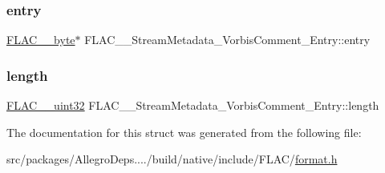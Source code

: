 \subsubsection{\texorpdfstring{entry}{entry}}
{\footnotesize\ttfamily \hyperlink{ordinals_8h_a5eb569b12d5b047cdacada4d57924ee3}{F\+L\+A\+C\+\_\+\+\_\+byte}$\ast$ F\+L\+A\+C\+\_\+\+\_\+\+Stream\+Metadata\+\_\+\+Vorbis\+Comment\+\_\+\+Entry\+::entry}

\mbox{\label{struct_f_l_a_c_____stream_metadata___vorbis_comment___entry_aa375f16819aaa4f7e08d8009167cb19e}} 
\subsubsection{\texorpdfstring{length}{length}}
{\footnotesize\ttfamily \hyperlink{ordinals_8h_a9c4005ea7ef8d564b0cc993cdd0e4e5e}{F\+L\+A\+C\+\_\+\+\_\+uint32} F\+L\+A\+C\+\_\+\+\_\+\+Stream\+Metadata\+\_\+\+Vorbis\+Comment\+\_\+\+Entry\+::length}



The documentation for this struct was generated from the following file\+:\begin{DoxyCompactItemize}
\item 
src/packages/\+Allegro\+Deps..../build/native/include/\+F\+L\+A\+C/\hyperlink{format_8h}{format.\+h}\end{DoxyCompactItemize}
